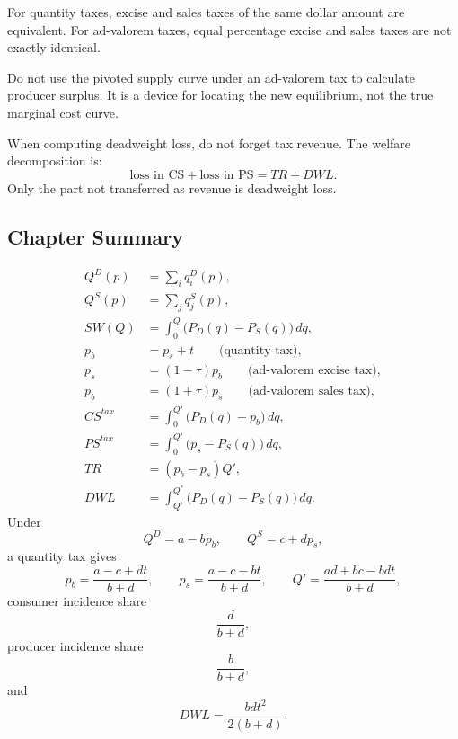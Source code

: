 \begin{commonmistake}
For quantity taxes, excise and sales taxes of the same dollar amount are equivalent. For ad-valorem taxes, equal percentage excise and sales taxes are not exactly identical.
\end{commonmistake}

\begin{commonmistake}
Do not use the pivoted supply curve under an ad-valorem tax to calculate producer surplus. It is a device for locating the new equilibrium, not the true marginal cost curve.
\end{commonmistake}

\begin{commonmistake}
When computing deadweight loss, do not forget tax revenue. The welfare decomposition is:
\[
\text{loss in CS}+\text{loss in PS}
=
TR + DWL.
\]
Only the part not transferred as revenue is deadweight loss.
\end{commonmistake}

\subsection{Chapter Summary}

\begin{keyformula}[title={Key Formula: Lecture 8 Summary}]
\begin{align*}
Q^D(p) &= \sum_i q_i^D(p), \\
Q^S(p) &= \sum_j q_j^S(p), \\
SW(Q) &= \int_0^Q \bigl(P_D(q)-P_S(q)\bigr)\,dq, \\
p_b &= p_s+t \qquad \text{(quantity tax)}, \\
p_s &= (1-\tau)p_b \qquad \text{(ad-valorem excise tax)}, \\
p_b &= (1+\tau)p_s \qquad \text{(ad-valorem sales tax)}, \\
CS^{tax} &= \int_0^{Q'} \bigl(P_D(q)-p_b\bigr)\,dq, \\
PS^{tax} &= \int_0^{Q'} \bigl(p_s-P_S(q)\bigr)\,dq, \\
TR &= (p_b-p_s)Q', \\
DWL &= \int_{Q'}^{Q^*} \bigl(P_D(q)-P_S(q)\bigr)\,dq.
\end{align*}
Under
\[
Q^D=a-bp_b, \qquad Q^S=c+dp_s,
\]
a quantity tax gives
\[
p_b=\frac{a-c+dt}{b+d},
\qquad
p_s=\frac{a-c-bt}{b+d},
\qquad
Q'=\frac{ad+bc-bdt}{b+d},
\]
consumer incidence share
\[
\frac{d}{b+d},
\]
producer incidence share
\[
\frac{b}{b+d},
\]
and
\[
DWL=\frac{bdt^2}{2(b+d)}.
\]
\end{keyformula}

